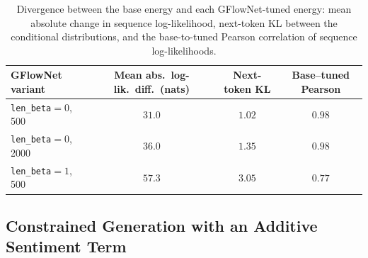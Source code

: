 \begin{table}[t]
    \centering
    \small
    \setlength{\tabcolsep}{4pt}
    \begin{tabular}{lccc}
        \toprule
        GFlowNet variant & Mean abs.\ log-lik.\ diff.\ (nats) & Next-token KL & Base--tuned Pearson \\
        \midrule
        \texttt{len\_beta}$=0$, 500  & $31.0$ & $1.02$ & $0.98$ \\
        \texttt{len\_beta}$=0$, 2000 & $36.0$ & $1.35$ & $0.98$ \\
        \texttt{len\_beta}$=1$, 500  & $57.3$ & $3.05$ & $0.77$ \\
        \bottomrule
    \end{tabular}
    \caption[Divergence between the base and GFlowNet-tuned energies.]{Divergence between the base energy and each GFlowNet-tuned energy: mean absolute change in sequence log-likelihood, next-token KL between the conditional distributions, and the base-to-tuned Pearson correlation of sequence log-likelihoods.}
    \label{tab:divergence}
\end{table}

\subsection{Constrained Generation with an Additive Sentiment Term}
\label{sec:results-constrained}

